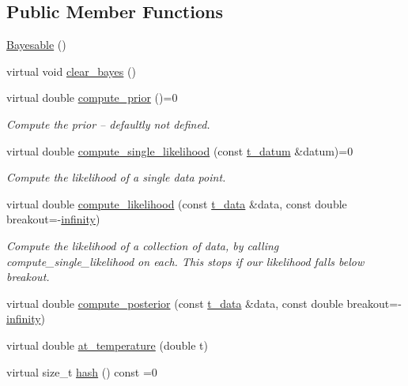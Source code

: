 \subsection*{Public Member Functions}
\begin{DoxyCompactItemize}
\item 
\hyperlink{class_bayesable_ab011f9e26a5c6e742d1239e7569df9eb}{Bayesable} ()
\item 
virtual void \hyperlink{class_bayesable_a3c7deaa8b0a270f806507a2a0768c54b}{clear\+\_\+bayes} ()
\item 
virtual double \hyperlink{class_bayesable_a9aa752f0adff1b95f8957b91fc928649}{compute\+\_\+prior} ()=0
\begin{DoxyCompactList}\small\item\em Compute the prior -- defaultly not defined. \end{DoxyCompactList}\item 
virtual double \hyperlink{class_bayesable_a5e0237ec7a40a2c45c990f93a8dc8e00}{compute\+\_\+single\+\_\+likelihood} (const \hyperlink{class_bayesable_a7c93a2eeab708378eb321745908718d4}{t\+\_\+datum} \&datum)=0
\begin{DoxyCompactList}\small\item\em Compute the likelihood of a single data point. \end{DoxyCompactList}\item 
virtual double \hyperlink{class_bayesable_af9547335ae15a5068b10d29aee5056ae}{compute\+\_\+likelihood} (const \hyperlink{class_bayesable_a70a593a67c7d43239ecc06bb4fd06a6b}{t\+\_\+data} \&data, const double breakout=-\/\hyperlink{_numerics_8h_a1bb1e42ae1b40cad6e99da0aab8a5576}{infinity})
\begin{DoxyCompactList}\small\item\em Compute the likelihood of a collection of data, by calling compute\+\_\+single\+\_\+likelihood on each. This stops if our likelihood falls below breakout. \end{DoxyCompactList}\item 
virtual double \hyperlink{class_bayesable_a6fb74010b3725f610f52746cc652f92a}{compute\+\_\+posterior} (const \hyperlink{class_bayesable_a70a593a67c7d43239ecc06bb4fd06a6b}{t\+\_\+data} \&data, const double breakout=-\/\hyperlink{_numerics_8h_a1bb1e42ae1b40cad6e99da0aab8a5576}{infinity})
\item 
virtual double \hyperlink{class_bayesable_ac9ba96f829785f07919610941077b4c9}{at\+\_\+temperature} (double t)
\item 
virtual size\+\_\+t \hyperlink{class_bayesable_ab77a023d33951448e6edb2e1bc79c5ae}{hash} () const =0

\end{DoxyCompactItemize}
